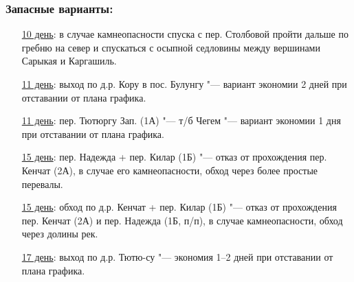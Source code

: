 		\subsubsection*{Запасные варианты:}
			\settowidth{\tmplen}{10 день: }
			\addtolength{\tmplen}{\leftmargin}
			\begin{enumerate}[leftmargin=\tmplen]
				\item[\uline{10 день}:] в случае камнеопасности спуска с пер. Столбовой пройти дальше по гребню на север и спускаться с осыпной седловины между вершинами Сарыкая и Каргашиль.
				\item[\uline{11 день}:] выход по д.р. Кору в пос. Булунгу "--- вариант экономии 2 дней при отставании от плана графика.
				\item[\uline{11 день}:] пер. Тютюргу Зап. (1А) "--- т/б Чегем "--- вариант экономии 1 дня при отставании от плана графика.
				\item[\uline{15 день}:] пер. Надежда + пер. Килар (1Б) "--- отказ от прохождения пер. Кенчат (2А), в случае его камнеопасности, обход через более простые перевалы.
				\item[\uline{15 день}:] обход по д.р. Кенчат + пер. Килар (1Б) "--- отказ от прохождения пер. Кенчат (2А) и пер. Надежда (1Б, п/п), в случае камнеопасности, обход через долины рек.
				\item[\uline{17 день}:] выход по д.р. Тютю-су "---  экономия 1--2 дней при отставании от плана графика.
			\end{enumerate}
		
